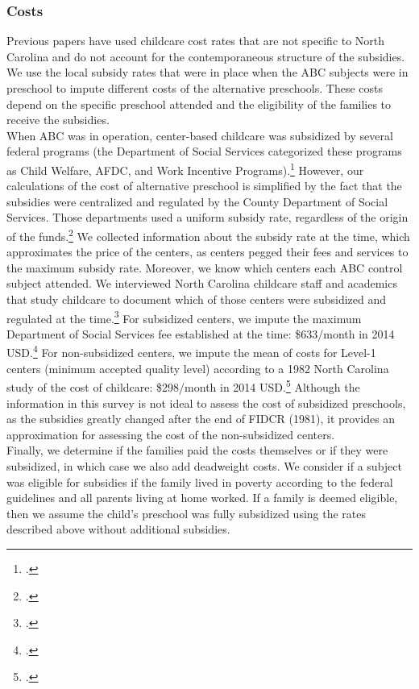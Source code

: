 \begin{appendices}
\subsubsection{Costs}
\noindent Previous papers have used childcare cost rates that are not specific to North Carolina and do not account for the contemporaneous structure of the subsidies. We use the local subsidy rates that were in place when the ABC subjects were in preschool to impute different costs of the alternative preschools. These costs depend on the specific preschool attended and the eligibility of the families to receive the subsidies. \\

\noindent When ABC was in operation, center-based childcare was subsidized by several federal programs (the Department of Social Services categorized these programs as Child Welfare, AFDC, and Work Incentive Programs).\footnote{\citet{licensed}.} However, our calculations of the cost of alternative preschool is simplified by the fact that the subsidies were centralized and regulated by the County Department of Social Services. Those departments used a uniform subsidy rate, regardless of the origin of the funds.\footnote{\citet{adhoc}.} We collected information about the subsidy rate at the time, which approximates the price of the centers, as centers pegged their fees and services to the maximum subsidy rate. Moreover, we know which centers each ABC control subject attended. We interviewed North Carolina childcare staff and academics that study childcare to document which of those centers were subsidized and regulated at the time.\footnote{\citet{clifford,sue}.} For subsidized centers, we impute the maximum Department of Social Services fee established at the time: \$633/month in 2014 USD.\footnote{\citet{adhoc,durham}.} For non-subsidized centers, we impute the mean of costs for Level-1 centers (minimum accepted quality level) according to a 1982 North Carolina study of the cost of childcare: \$298/month in 2014 USD.\footnote{\citet{study}.} Although the information in this survey is not ideal to assess the cost of subsidized preschools, as the subsidies greatly changed after the end of FIDCR (1981), it provides an approximation for assessing the cost of the non-subsidized centers. \\

\noindent Finally, we determine if the families paid the costs themselves or if they were subsidized, in which case we also add deadweight costs. We consider if a subject was eligible for subsidies if the family lived in poverty according to the federal guidelines and all parents living at home worked. If a family is deemed eligible, then we assume the child's preschool was fully subsidized using the rates described above without additional subsidies. \\


\end{appendices}
